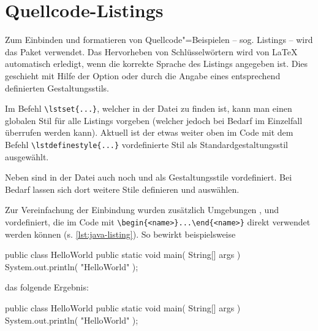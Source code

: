 \section{Quellcode-Listings}%
%
\label{sec:Listings}
%
Zum Einbinden und formatieren von Quellcode"=Beispielen
-- sog. Listings -- wird das Paket 
\parencite{Hoffmann2014} verwendet.
Das Hervorheben von Schlüsselwörtern
wird von LaTeX automatisch erledigt,
wenn die korrekte Sprache des Listings angegeben ist.
Dies geschieht mit Hilfe der Option 
oder durch die Angabe eines entsprechend definierten Gestaltungsstils.

Im Befehl \lstinline|\lstset{...}|,
welcher in der Datei  zu finden ist,
kann man einen globalen Stil für alle Listings vorgeben
(welcher jedoch bei Bedarf im Einzelfall überrufen werden kann).
Aktuell ist der etwas weiter oben im Code mit dem Befehl
\lstinline|\lstdefinestyle{...}| vordefinierte Stil
 als Standardgestaltungsstil ausgewählt.

Neben  sind in der Datei 
auch noch  und  als Gestaltungsstile vordefiniert.
Bei Bedarf lassen sich dort weitere Stile definieren und auswählen.

Zur Vereinfachung der Einbindung wurden zusätzlich Umgebungen
,  und 
vordefiniert, die im Code mit \lstinline|\begin{<name>}...\end{<name>}|
direkt verwendet werden können (s. \cref{lst:java-listing}).
%
So bewirkt beispielsweise
%
\begin{latex}[caption={Beispiel eines Listings in Java},label={lst:java-listing}]
\begin{java}[caption={Ein Hello-World Beispiel in Java},%
             label={lst:hello-world}]
public class HelloWorld {
  public static void main( String[] args ) {
    System.out.println( "HelloWorld" );
  }
}
\end{java}
\end{latex}
%
das folgende Ergebnis:
%
\begin{C++}[caption={Ein Hello-World Beispiel in Java},label={lst:hello-world}]
public class HelloWorld {
  public static void main( String[] args ) {
    System.out.println( "HelloWorld" );
  }
}
\end{C++}

